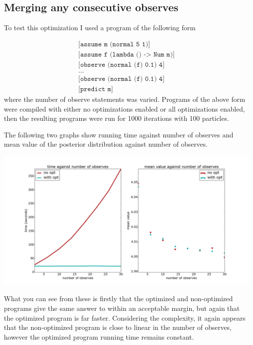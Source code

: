 \documentclass[a4paper]{article}
\begin{document}

\subsection{Merging any consecutive observes}

To test this optimization I used a program of the following form

\[
	\begin{array}{l}
		\texttt{[assume m (normal 5 1)]} \\
		\texttt{[assume f (lambda () -> Num m)]} \\
		\texttt{[observe (normal (f) 0.1) 4]} \\
		\texttt{...} \\
		\texttt{[observe (normal (f) 0.1) 4]} \\
		\texttt{[predict m]}
	\end{array}
\]
where the number of observe statements was varied. Programs of the above form were compiled with either no optimizations enabled or all optimizations enabled, then the resulting programs were run for 1000 iterations with 100 particles.

The following two graphs show running time against number of observes and mean value of the posterior distribution against number of observes.

\centerline{\includegraphics[width=16cm]{images/merging_consecutive_observes_1.png}}

What you can see from these is firstly that the optimized and non-optimized programs give the same answer to within an acceptable margin, but again that the optimized program is far faster. Considering the complexity, it again appears that the non-optimized program is close to linear in the number of observes, however the optimized program running time remains constant.
\end{document}
